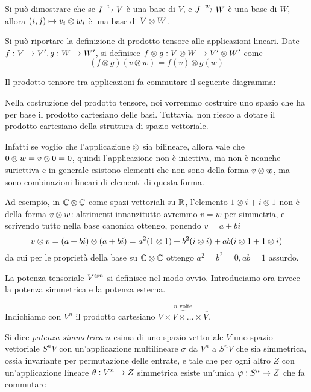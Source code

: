   Si può dimostrare che se $I \xrightarrow v V$ è una base di $V$, e $J \xrightarrow w W$ è una base di $W$, allora $(i,j) \mapsto v_i \otimes w_i$ è una base di $V\otimes W$.

  \begin{mydef}
    Si può riportare la definizione di prodotto tensore alle applicazioni lineari. Date $f:V \rightarrow V', g: W \rightarrow W'$, si definisce $f\otimes g: V\otimes W \rightarrow V'\otimes W'$ come
      \[
	(f \otimes g)(v\otimes w)=f(v)\otimes g(w) 
      \]
    
    Il prodotto tensore tra applicazioni fa commutare il seguente diagramma:
    
   
   \end{mydef}

  \begin{myobs}
   Nella costruzione del prodotto tensore, noi vorremmo costruire uno spazio che ha per base il prodotto cartesiano delle basi. Tuttavia, non riesco a dotare il prodotto cartesiano della struttura di spazio vettoriale.
   
   Infatti se voglio che l'applicazione $\otimes$ sia bilineare, allora vale che $0 \otimes w = v \otimes 0 = 0$, quindi l'applicazione non è iniettiva, ma non è neanche suriettiva e in generale esistono elementi che non sono della forma $v \otimes w$, ma sono combinazioni lineari di elementi di questa forma.
  \end{myobs}
  \begin{myexample}
  
   Ad esempio, in $\mathbb C \otimes \mathbb C$ come spazi vettoriali su $\mathbb R$, l'elemento $1 \otimes i + i \otimes 1$ non è della forma $v\otimes w$: altrimenti innanzitutto avremmo $v=w$ per simmetria, e scrivendo tutto nella base canonica ottengo, ponendo $v=a+bi$
   \[
    v\otimes v= (a+bi)\otimes (a+bi) = a^2(1\otimes 1) + b^2 (i\otimes i) + ab(i\otimes 1 +1\otimes i)
   \]
   da cui per le proprietà della base su $\mathbb C\otimes \mathbb C$ ottengo $a^2=b^2=0, ab=1$ assurdo.

  \end{myexample}
  
  La potenza tensoriale $V^{\otimes n}$ si definisce nel modo ovvio. Introduciamo ora invece la potenza simmetrica e la potenza esterna.
   
  \begin{mydef}
   Indichiamo con $V^n$ il prodotto cartesiano $\overbrace{V \times V \times \dots \times V}^{n \textrm{ volte}}$.
   
   Si dice \emph{potenza simmetrica} $n$-esima di uno spazio vettoriale $V$ uno spazio vettoriale $S^nV$ con un'applicazione multilineare $\sigma$ da $V^n$ a $S^nV$ che sia simmetrica, ossia invariante per permutazione delle entrate, e tale che per ogni altro $Z$ con un'applicazione lineare $\theta: V^n \rightarrow Z$ simmetrica esiste un'unica $\varphi: S^n \rightarrow Z$ che fa commutare 
   
  
  \end{mydef}

